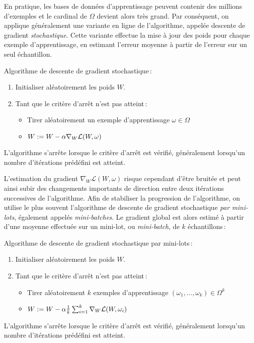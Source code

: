  En pratique, les bases de données d'apprentissage peuvent contenir des millions d'exemples et le cardinal de $\Omega$ devient alors très grand. Par conséquent, on applique généralement une variante en ligne de l'algorithme, appelée descente de gradient \emph{stochastique}. Cette variante effectue la mise à jour des poids pour chaque exemple d'apprentissage, en estimant l'erreur moyenne à partir de l'erreur sur un seul échantillon.
\begin{definition}
  Algorithme de descente de gradient stochastique\,:
  \begin{enumerate}
    \item Initialiser aléatoirement les poids $W$.
    \item Tant que le critère d'arrêt n'est pas atteint\,:
      \begin{itemize}
          \item Tirer aléatoirement un exemple d'apprentissage $\omega \in \Omega$
          \item $W := W - \alpha \nabla_W \mathcal{L}(W, \omega)$
      \end{itemize}
  \end{enumerate}
L'algorithme s'arrête lorsque le critère d'arrêt est vérifié, généralement lorsqu'un nombre d'itérations prédéfini est atteint.
\end{definition}

L'estimation du gradient $\nabla_W \mathcal{L}(W, \omega)$ risque cependant d'être bruitée et peut ainsi subir des changements importants de direction entre deux itérations successives de l'algorithme. Afin de stabiliser la progression de l'algorithme, on utilise le plus souvent l'algorithme de descente de gradient stochastique \emph{par mini-lots}, également appelés \emph{mini-batches}. Le gradient global est alors estimé à partir d'une moyenne effectuée sur un mini-lot, ou \emph{mini-batch}, de $k$ échantillons\,:
\begin{definition}
  Algorithme de descente de gradient stochastique par mini-lots\,:
  \begin{enumerate}
    \item Initialiser aléatoirement les poids $W$.
    \item Tant que le critère d'arrêt n'est pas atteint\,:
      \begin{itemize}
          \item Tirer aléatoirement $k$ exemples d'apprentissage $(\omega_1,\dots,\omega_k) \in \Omega^k$
          \item $W := W - \alpha \frac{1}{k} \sum_{i=1}^k \nabla_W \mathcal{L}(W, \omega_i)$
      \end{itemize}
  \end{enumerate}
L'algorithme s'arrête lorsque le critère d'arrêt est vérifié, généralement lorsqu'un nombre d'itérations prédéfini est atteint.
\end{definition}

